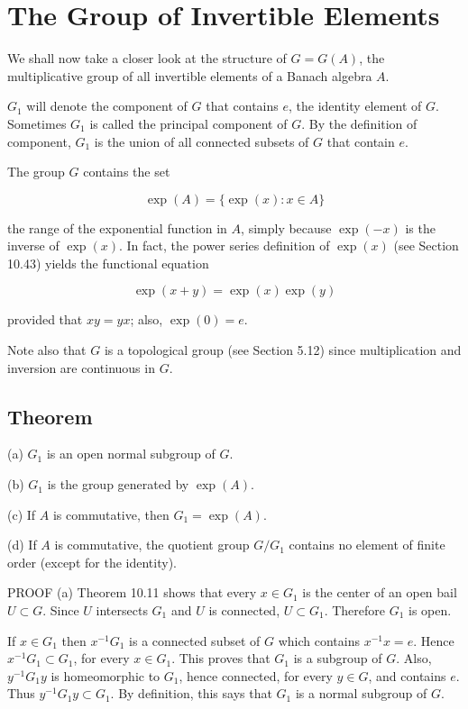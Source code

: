 \documentclass[10pt]{article}
\begin{document}
\section{The Group of Invertible Elements}
We shall now take a closer look at the structure of $G=G(A)$, the multiplicative group of all invertible elements of a Banach algebra $A$.

$G_{1}$ will denote the component of $G$ that contains $e$, the identity element of $G$. Sometimes $G_{1}$ is called the principal component of $G$. By the definition of component, $G_{1}$ is the union of all connected subsets of $G$ that contain $e$.

The group $G$ contains the set

$$
\exp (A)=\{\exp (x): x \in A\}
$$

the range of the exponential function in $A$, simply because $\exp (-x)$ is the inverse of $\exp (x)$. In fact, the power series definition of $\exp (x)$ (see Section 10.43) yields the functional equation

$$
\exp (x+y)=\exp (x) \exp (y)
$$

provided that $x y=y x$; also, $\exp (0)=e$.

Note also that $G$ is a topological group (see Section 5.12) since multiplication and inversion are continuous in $G$.

\subsection{Theorem}
(a) $G_{1}$ is an open normal subgroup of $G$.

(b) $G_{1}$ is the group generated by $\exp (A)$.

(c) If $A$ is commutative, then $G_{1}=\exp (A)$.

(d) If $A$ is commutative, the quotient group $G / G_{1}$ contains no element of finite order (except for the identity).

PROOF (a) Theorem 10.11 shows that every $x \in G_{1}$ is the center of an open bail $U \subset G$. Since $U$ intersects $G_{1}$ and $U$ is connected, $U \subset G_{1}$. Therefore $G_{1}$ is open.

If $x \in G_{1}$ then $x^{-1} G_{1}$ is a connected subset of $G$ which contains $x^{-1} x=e$. Hence $x^{-1} G_{1} \subset G_{1}$, for every $x \in G_{1}$. This proves that $G_{1}$ is a subgroup of $G$. Also, $y^{-1} G_{1} y$ is homeomorphic to $G_{1}$, hence connected, for every $y \in G$, and contains $e$. Thus $y^{-1} G_{1} y \subset G_{1}$. By definition, this says that $G_{1}$ is a normal subgroup of $G$.
\end{document}
